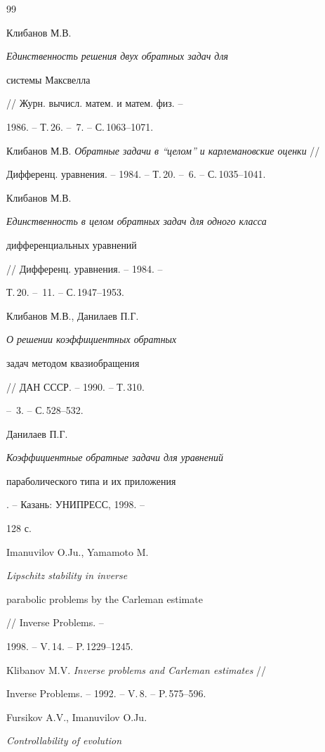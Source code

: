 \begin{thebibliography}{99} 


 




Клибанов М.В. {\em Единственность решения двух обратных задач для 


системы Максвелла} // Журн. вычисл. матем. и матем. физ. -- 


1986. -- Т.\,26. -- \No\,7. -- С.\,1063--1071. 




Клибанов М.В. {\em Обратные задачи в ``целом'' и карлемановские оценки} // 


Дифференц. уравнения. -- 1984. -- Т.\,20. -- \No\,6. -- С.\,1035--1041. 




Клибанов М.В. {\em Единственность в целом обратных задач для одного класса 


дифференциальных уравнений} // Дифференц. уравнения. -- 1984. -- 


Т.\,20. -- \No\,11. -- С.\,1947--1953. 




Клибанов М.В., Данилаев П.Г. {\em О решении коэффициентных обратных 


задач методом квазиобращения} // ДАН СССР. -- 1990. -- Т.\,310. 


-- \No\,3. -- С.\,528--532. 




Данилаев П.Г. {\em Коэффициентные обратные задачи для уравнений 


параболического типа и их приложения}. -- Казань: УНИПРЕСС, 1998. -- 


128 с. 




Imanuvilov O.Ju., Yamamoto M. {\em Lipschitz stability in inverse 


parabolic problems by the Carleman estimate} // Inverse Problems. -- 


1998. -- V.\,14. -- P.\,1229--1245. 




Klibanov M.V. {\em Inverse problems and Carleman estimates} // 


Inverse Problems. -- 1992. -- V.\,8. -- P.\,575--596. 




Fursikov A.V., Imanuvilov O.Ju. {\em Controllability of evolution 


}
\end{thebibliography}
